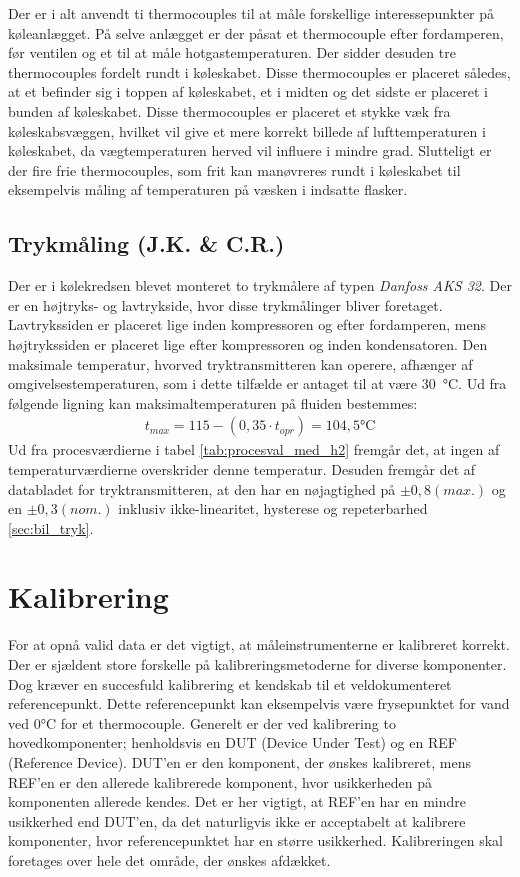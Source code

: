 \documentclass[../Hovedrapport.tex]{subfiles}
\begin{document}
Der er i alt anvendt ti thermocouples til at måle forskellige interessepunkter på køleanlægget. På selve anlægget er der påsat et thermocouple efter fordamperen, før ventilen og et til at måle hotgastemperaturen. Der sidder desuden tre thermocouples fordelt rundt i køleskabet. Disse thermocouples er placeret således, at et befinder sig i toppen af køleskabet, et i midten og det sidste er placeret i bunden af køleskabet. Disse thermocouples er placeret et stykke væk fra køleskabsvæggen, hvilket vil give et mere korrekt billede af lufttemperaturen i køleskabet, da vægtemperaturen herved vil influere i mindre grad. Slutteligt er der fire frie thermocouples, som frit kan manøvreres rundt i køleskabet til eksempelvis måling af temperaturen på væsken i indsatte flasker.
\subsection{Trykmåling (J.K. \& C.R.)}
Der er i kølekredsen blevet monteret to trykmålere af typen \textit{Danfoss AKS 32}. Der er en højtryks- og lavtrykside, hvor disse trykmålinger bliver foretaget. Lavtrykssiden er placeret lige inden kompressoren og efter fordamperen, mens højtrykssiden er placeret lige efter kompressoren og inden kondensatoren. Den maksimale temperatur, hvorved tryktransmitteren kan operere, afhænger af omgivelsestemperaturen, som i dette tilfælde er antaget til at være \SI{30}{\celsius}. Ud fra følgende ligning kan maksimaltemperaturen på fluiden bestemmes:
\begin{align}
t_{max}=115-(0,35\cdot t_{opr})=104,5\si{\celsius}
\end{align}
 Ud fra procesværdierne i tabel \ref{tab:procesval_med_h2} fremgår det, at ingen af temperaturværdierne overskrider denne temperatur. Desuden fremgår det af databladet for tryktransmitteren, at den har en nøjagtighed på $\pm 0,8 (max.)$ og en $\pm0,3 (nom.)$ inklusiv ikke-linearitet, hysterese og repeterbarhed \ref{sec:bil_tryk}. 
\section{Kalibrering}
For at opnå valid data er det vigtigt, at måleinstrumenterne er kalibreret korrekt. Der er sjældent store forskelle på kalibreringsmetoderne for diverse komponenter. Dog kræver en succesfuld kalibrering et kendskab til et veldokumenteret referencepunkt. Dette referencepunkt kan eksempelvis være frysepunktet for vand ved $0\si{\celsius}$ for et thermocouple. Generelt er der ved kalibrering to hovedkomponenter; henholdsvis en DUT (Device Under Test) og en REF (Reference Device). DUT'en er den komponent, der ønskes kalibreret, mens REF'en er den allerede kalibrerede komponent, hvor usikkerheden på komponenten allerede kendes. Det er her vigtigt, at REF'en har en mindre usikkerhed end DUT'en, da det naturligvis ikke er acceptabelt at kalibrere komponenter, hvor referencepunktet har en større usikkerhed. Kalibreringen skal foretages over hele det område, der ønskes afdækket. 
\end{document}
